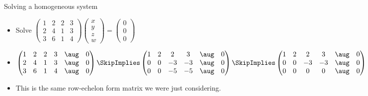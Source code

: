\documentclass{beamer}
\begin{document}
\begin{frame}{Solving a homogeneous system}
\begin{itemize}
\item Solve
$
\begin{pmatrix}
1 & 2 & 2 & 3 \\
2 & 4 & 1 & 3 \\
3 & 6 & 1 & 4
\end{pmatrix}
\begin{pmatrix}
x \\ y \\ z \\ w
\end{pmatrix}=
\begin{pmatrix}
0 \\ 0 \\ 0
\end{pmatrix}
$
\item
$
\begin{pmatrix}
1 & 2 & 2 & 3 & \aug & 0 \\
2 & 4 & 1 & 3 & \aug & 0  \\
3 & 6 & 1 & 4 & \aug & 0
\end{pmatrix}
\SkipImplies
\begin{pmatrix}
1 & 2 & 2 & 3 & \aug & 0  \\
0 & 0 & -3 & -3  & \aug & 0  \\
0 & 0 & -5 & -5 & \aug & 0
\end{pmatrix}
\SkipImplies
\begin{pmatrix}
1 & 2 & 2 & 3    & \aug & 0  \\
0 & 0 & -3 & -3  & \aug & 0  \\
0 & 0 & 0 & 0    & \aug & 0
\end{pmatrix}
$
\item This is the same row-echelon form matrix we were just considering.
\end{itemize}
\end{frame}
\end{document}
